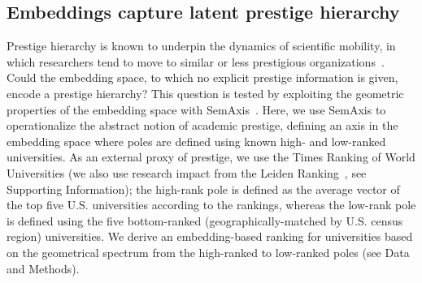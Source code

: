 \documentclass[12pt]{article} %
\def\SI{Supporting Information}
\begin{document}
%
%
\subsection*{Embeddings capture latent prestige hierarchy}

Prestige hierarchy is known to underpin the dynamics of scientific mobility, in which researchers tend to move to similar or less prestigious organizations~\autocite{deville2014career, clauset2015hierarchy}. Could the embedding space, to which no explicit prestige information is given, encode a prestige hierarchy?
This question is tested by exploiting the geometric properties of the embedding space with SemAxis~\autocite{an2018semaxis}.
Here, we use SemAxis to operationalize the abstract notion of academic prestige, defining an axis in the embedding space where poles are defined using known high- and low-ranked universities.
As an external proxy of prestige, we use the Times Ranking of World Universities (we also use research impact from the Leiden Ranking~\autocite{waltman2012leidenrankings}, see \SI);
the high-rank pole is defined as the average vector of the top five U.S. universities according to the rankings, whereas the low-rank pole is defined using the five bottom-ranked (geographically-matched by U.S. census region) universities.
We derive an embedding-based ranking for universities based on the geometrical spectrum from the high-ranked to low-ranked poles (see Data and Methods).
\end{document}
